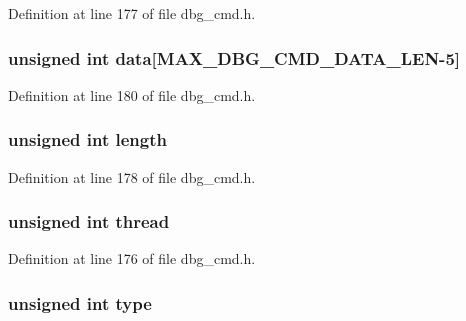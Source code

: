 Definition at line 177 of file dbg\-\_\-cmd.\-h.

\hypertarget{structdbg__cmd__type__remove__break_ab91dff01c2f12e354ddb4becbe93f063}{
\subsubsection[{data}]{\setlength{\rightskip}{0pt plus 5cm}unsigned int data\mbox{[}{\bf M\-A\-X\-\_\-\-D\-B\-G\-\_\-\-C\-M\-D\-\_\-\-D\-A\-T\-A\-\_\-\-L\-E\-N}-\/5\mbox{]}}}\label{structdbg__cmd__type__remove__break_ab91dff01c2f12e354ddb4becbe93f063}


Definition at line 180 of file dbg\-\_\-cmd.\-h.

\hypertarget{structdbg__cmd__type__remove__break_ac8d42bcd4a44e078047ccd7291059238}{
\subsubsection[{length}]{\setlength{\rightskip}{0pt plus 5cm}unsigned int length}}\label{structdbg__cmd__type__remove__break_ac8d42bcd4a44e078047ccd7291059238}


Definition at line 178 of file dbg\-\_\-cmd.\-h.

\hypertarget{structdbg__cmd__type__remove__break_a13f572e7828e1694c6f9c9c78bf7d8f5}{
\subsubsection[{thread}]{\setlength{\rightskip}{0pt plus 5cm}unsigned int thread}}\label{structdbg__cmd__type__remove__break_a13f572e7828e1694c6f9c9c78bf7d8f5}


Definition at line 176 of file dbg\-\_\-cmd.\-h.

\hypertarget{structdbg__cmd__type__remove__break_a4bfea42429249a1f65204f0c0f34704a}{
\subsubsection[{type}]{\setlength{\rightskip}{0pt plus 5cm}unsigned int type}}\label{structdbg__cmd__type__remove__break_a4bfea42429249a1f65204f0c0f34704a}


